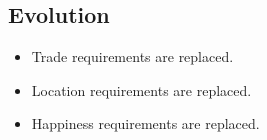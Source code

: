 \documentclass{article}
\begin{document}
\begin{comment}
Starter: {318, 408, 528}
  * #002 *Ivysaur* +2 PA, +1 PD | total from 405 to 408
  * #003 *Venusaur* +2 PA, +1 PD | total from 525 to 528
    * *Mega Venusaur* +4 PA, +1 PD, -2 SA | total from 625 to 628
  * #153 *Bayleef* +2 PA, +1 SA | total from 405 to 408
  * #154 *Meganium* +2 PA, +1 SA | total from 525 to 528
  * #253 *Grovyle* +3 HP | total from 405 to 408
  * #254 *Sceptile* +3 HP, -5 CS | total from 530 to 528
    * *Mega Sceptile* +3 HP, -5 CS | total from 630 to 628

changed in Generation VI:
  * #012 Butterfree +10 SA
  * #015 Beedrill +10 PA
  * #018 Pidgeot +10 CS
  * #025 Pikachu +10 PD and +10 SD
  * #026 Raichu +10 CS
  * #031 Nidoqueen +10 PA
  * #034 Nidoking +10 PA
  * #036 Clefable +10 SA
  * #040 Wigglytuff +10 SA
  * #045 Vileplume +10 SA
  * #062 Poliwrath +10 PA
  * #065 Alakazam +10 SD
  * #071 Victreebel +10 SD
  * #076 Golem +10 PA
  * #181 Ampharos +10 PD
  * #182 Bellossom +10 PD
  * #184 Azumarill +10 SA
  * #189 Jumpluff +10 SD
  * #267 Beautifly +10 SA
  * #295 Exploud +10 SD
  * #398 Staraptor +10 SD
  * #407 Roserade +10 PD
  * #508 Stoutland +10 PA
  * #521 Unfezant +10 PA
  * #526 Gigalith +10 SD
  * #537 Seismitoad +10 PA
  * #542 Leavanny +10 SD
  * #545 Scolipede +10 PA
  * #553 Krookodile +10 PD

changed in Generation VII:
  * #024 Arbok +10 PA
  * #051 Dugtrio +20 PA
  * #083 Farfetch'd +25 PA
  * #085 Dodrio +10 CS
  * #101 Electrode +10 CS
  * #103 Exeggutor +10 SD
  * #164 Noctowl +10 SA
  * #168 Ariados +10 SD
  * #211 Qwilfish +10 PD
  * #219 Magcargo +10 SA
  * #222 Corsola +10 HP, 10 PD, +10 SD
  * #226 Mantine +20 HP
  * #277 Swellow +25 SA
  * #279 Pelipper +10 SA
  * #284 Masquerain +20 SA, +20 CS
  * #301 Delcatty +20 CS
  * #313 Volbeat +20 PD, +10 SD
  * #314 Illumise +20 PD, +10 SD
  * #337 Lunatone +20 HP
  * #338 Solrock +20 HP
  * #358 Chimecho +10 HP, +10 PD, +10 SD
  * #527 Woobat +10 HP
  * #558 Crustle +10 PA
  * #614 Beartic +20 PA
  * #615 Cryogonal +10 HP, +20 PD

\end{comment}

\clearpage
\normalsize
\subsection{Evolution}
\begin{itemize}
\item Trade requirements are replaced.
\item Location requirements are replaced.
\item Happiness requirements are replaced.
\end{itemize}
\end{document}
